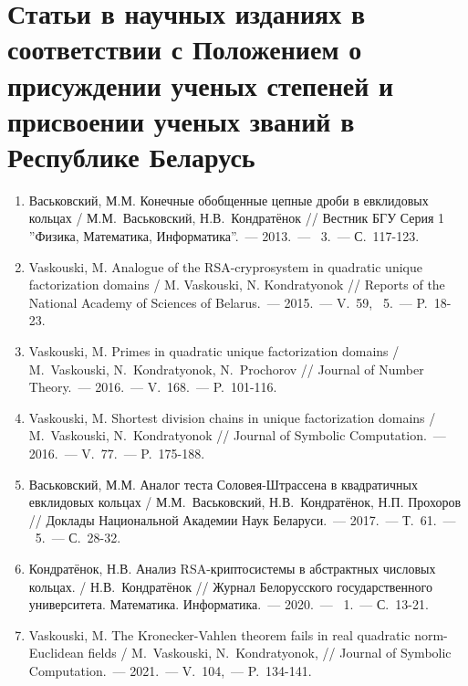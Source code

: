 \vspace{-4ex}
\section*{\fontsize{14}{15}\selectfont Статьи в научных изданиях в соответствии с Положением о присуждении ученых степеней и присвоении ученых званий в Республике Беларусь}
\vspace{-4ex}

\begin{enumerate}

    \item \label{source:Vestnik_BSU_2013}
    Васьковский, М.М. Конечные обобщенные цепные дроби в евклидовых кольцах / М.М.~Васьковский, Н.В.~Кондратёнок // Вестник БГУ Серия 1 ''Физика, Математика, Информатика''.~--- 2013.~--- \textnumero~3.~--- С.~117-123.

    \item \label{source:NANB_2015}
    Vaskouski, M. Analogue of the RSA-cryprosystem in quadratic unique factorization domains / M. Vaskouski, N. Kondratyonok // Reports of the National Academy of Sciences of Belarus.~--- 2015.~--- V.~59, \textnumero~5.~--- P.~18-23.

    \item \label{source:JNT_2016}
    Vaskouski, M. Primes in quadratic unique factorization domains / M.~Vaskouski, N.~Kondratyonok, N.~Prochorov // Journal of Number Theory.~--- 2016.~--- V.~168.~--- P.~101-116.

    \item \label{source:JSC_2016}
    Vaskouski, M. Shortest division chains in unique factorization domains / M.~Vaskouski, N.~Kondratyonok // Journal of Symbolic Computation.~--- 2016.~--- V.~77.~--- P.~175-188.

    \item \label{source:NANB_2017}
    Васьковский, М.М. Аналог теста Соловея-Штрассена в квадратичных евклидовых кольцах / М.М.~Васьковский, Н.В.~Кондратёнок, Н.П. Прохоров // Доклады Национальной Академии Наук Беларуси.~--- 2017.~--- Т.~61.~--- \textnumero~5.~--- С.~28-32.

    \item \label{source:BSU_Journal_2020}
    Кондратёнок, Н.В. Анализ RSA-криптосистемы в абстрактных числовых кольцах. / Н.В.~Кондратёнок // Журнал Белорусского государственного университета. Математика. Информатика.~--- 2020.~--- \textnumero~1.~--- С.~13-21.

    \item \label{source:JSC_2021}
    Vaskouski, M. The Kronecker-Vahlen theorem fails in real quadratic norm-Euclidean fields / M.~Vaskouski, N.~Kondratyonok, // Journal of Symbolic Computation.~--- 2021.~--- V.~104,~--- P.~134-141.
\end{enumerate}


